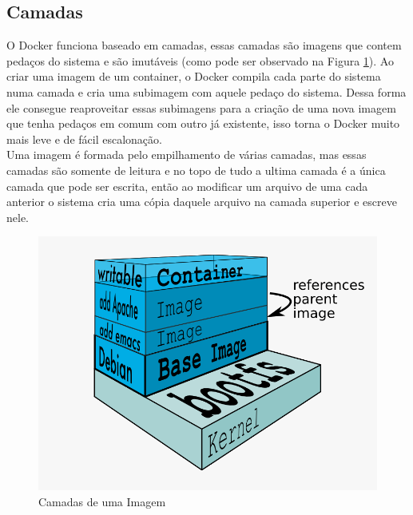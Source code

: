 \documentclass[twocolumn, letterpaper]{scrartcl}
\begin{document}
\subsection*{\color{triton_blue}Camadas}
O Docker funciona baseado em camadas, essas camadas são imagens que contem pedaços do sistema e são imutáveis (como pode ser observado na Figura \ref{fig:docker_layers}). Ao criar uma imagem de um container, o Docker compila cada parte do sistema numa camada e cria uma subimagem com aquele pedaço do sistema. Dessa forma ele consegue reaproveitar essas subimagens para a criação de uma nova imagem que tenha pedaços em comum com outro já existente, isso torna o Docker muito mais leve e de fácil escalonação.\\
Uma imagem é formada pelo empilhamento de várias camadas, mas essas camadas são somente de leitura e no topo de tudo a ultima camada é a única camada que pode ser escrita, então ao modificar um arquivo de uma cada anterior o sistema cria uma cópia daquele arquivo na camada superior e escreve nele.

\begin{figure}
    \centering
    \includegraphics[scale=0.25]{imgs/docker_layers.png}
    \caption{Camadas de uma Imagem}
    \label{fig:docker_layers}
\end{figure}
\end{document}
